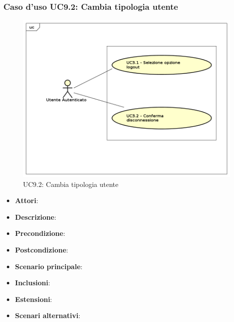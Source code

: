 			\subsubsection{Caso d'uso UC9.2: Cambia tipologia utente}
			\label{UC9.2}
			\begin{figure}[h]
				\centering
			\includegraphics[scale=0.7,keepaspectratio]{UML/UC9.png}
				\caption{UC9.2: Cambia tipologia utente}
			\end{figure}
			\FloatBarrier
			\begin{itemize}
				\item \textbf{Attori}: 
				\item \textbf{Descrizione}: 
				\item \textbf{Precondizione}: 
				\item \textbf{Postcondizione}: 
				\item \textbf{Scenario principale}:
				\item \textbf{Inclusioni}:
				\item \textbf{Estensioni}:
				\item \textbf{Scenari alternativi}:
			\end{itemize}
			
